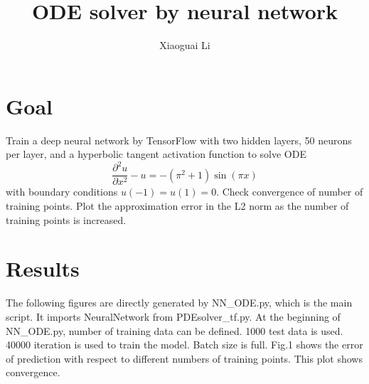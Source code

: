 \documentclass{article}
\title{ODE solver by neural network}
\author{Xiaoguai Li}
\date{}
\begin{document}
\maketitle

\section{Goal}
Train a deep neural network by TensorFlow with two hidden layers, 50 neurons per layer, and a hyperbolic tangent activation function to solve ODE
\begin{equation}\nonumber
\frac{\partial^2 u}{\partial x^2} - u = -(\pi^2+1)\sin(\pi x)
\end{equation}
with boundary conditions $u(-1)=u(1)=0$.
Check convergence of number of training points. Plot the approximation error in the L2 norm as the number of training points is increased.

\section{Results}
The following figures are directly generated by NN\_ODE.py, which is the main script. It imports NeuralNetwork from PDEsolver\_tf.py. At the beginning of NN\_ODE.py, number of training data can be defined.
1000 test data is used. 40000 iteration is used to train the model. Batch size is full. Fig.1
shows the error of prediction with respect to different numbers of training points. This plot shows
convergence.
\end{document}
